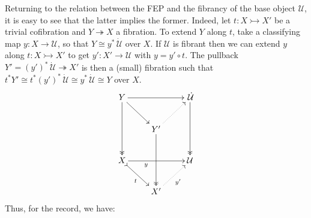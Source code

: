 \documentclass[12pt]{article}
\newcommand{\ra}{\ensuremath{\rightarrow}}
\newcommand{\cof}{\ensuremath{\rightarrowtail}}
\newcommand{\fib}{\ensuremath{\twoheadrightarrow}}
\newcommand{\I}{\ensuremath{\mathrm{I}}}
\newcommand{\U}{\ensuremath{\mathcal{U}}}
\newcommand{\UU}{\ensuremath{\,\dot{\mathcal{U}}}}
\newtheorem{proposition}[theorem]{Proposition}
\newtheorem{lemma}[theorem]{Lemma}
\theoremstyle{remark}
\theoremstyle{definition}
\begin{document}
%
%
%
%
%

Returning to the relation between the FEP and the fibrancy of the base object $\U$, it is easy to see that the latter implies the former.  Indeed, let $t : X\cof X'$ be a trivial cofibration and $Y \fib X$ a fibration.  To extend $Y$ along $t$, take a classifying map $y : X \ra \U$, so that $Y \cong y^*\UU$ over $X$. If $\U$ is fibrant then we can extend $y$ along $t : X\cof X'$ to get $y' : X' \ra \U$ with $y = y'\circ t$.  The pullback $Y' = (y')^*\UU \fib X'$ is then a (small) fibration such that $t^*Y' \cong t^*(y')^*\UU\cong y^*\UU \cong Y$ over $X$.  
\[
\xymatrix{
Y \ar@{->>}[dd] \ar[rd] \ar[rr] && \UU \ar@{->>}[dd] \\
& Y' \ar@{->>}[dd] \ar@{..>}[ru] & \\
X  \ar@{>->}[rd]_t \ar[rr]_<<<<<<<<{y}  && \U  \\
& X' \ar@{..>}[ru]_{y'} &
}
\]
Thus, for the record, we have:
\end{document}
